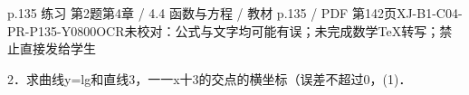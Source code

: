 \begin{bankitem}{p.135 练习 第2题}{第4章 / 4.4 函数与方程 / 教材 p.135 / PDF 第142页}{XJ-B1-C04-PR-P135-Y0800}{OCR未校对：公式与文字均可能有误；未完成数学TeX转写；禁止直接发给学生}
\begin{ocrdraft}
\par
2．求曲线y=lg和直线3，一一x十3的交点的横坐标（误差不超过0，(1)．
\end{ocrdraft}
\end{bankitem}
